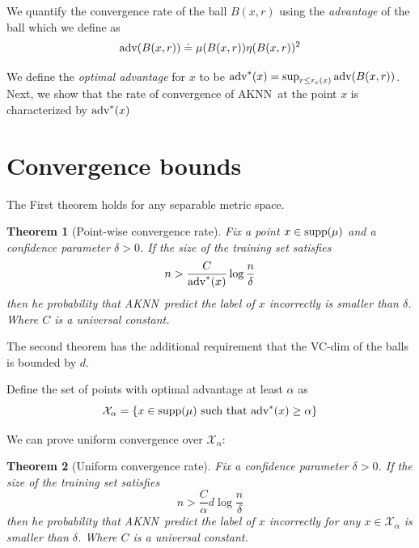 \documentclass{article}
\def\X{{\mathcal X}}
\def\supp{{\rm supp}}
\newcommand{\algname}{\textsc{AKNN}}
\newtheorem{theorem}{Theorem}
\begin{document}
We quantify the convergence rate of the ball $B(x,r)$ using the
{\em advantage} of the ball which we define as
\begin{equation}
\mbox{adv}(B(x,r)) \doteq \mu(B(x,r)) \eta(B(x,r))^2
\end{equation}

We define the {\em optimal advantage} for $x$ to be $\mbox{adv}^*(x)= \sup_{r \leq r_c(x)} \mbox{adv}(B(x,r))$.
Next, we show that the rate of convergence of \algname\ at the point $x$ is characterized by $\mbox{adv}^*(x)$

\section{Convergence bounds}

The First theorem holds for any separable metric space.
\begin{theorem} [Point-wise convergence rate]
Fix a point $x \in \supp(\mu)$ and a confidence parameter $\delta>0$. If the size of the training set satisfies   
$$ n > \frac{C}{\mbox{adv}^*(x)} \log \frac{n}{\delta}$$
then he probability that \algname\ predict the label of $x$ incorrectly is smaller than $\delta$. Where $C$ is a universal constant.
\end{theorem}


The second theorem has the additional requirement that the VC-dim of the balls is bounded by $d$.

Define the set of points with optimal advantage at least $\alpha$ as
$$ \X_\alpha = \left\{ x \in \supp(\mu) \mbox{ such that } \opt(x) \geq \alpha \right\} $$

We can prove uniform convergence over $\X_\alpha$:

\begin{theorem} [Uniform convergence rate]
Fix a confidence parameter $\delta>0$. If the size of the training set satisfies
$$ n > \frac{C}{\alpha} d \log \frac{n}{\delta}$$
then he probability that \algname\ predict the label of $x$ incorrectly for {\em any} $x \in \X_\alpha$ is smaller than $\delta$. Where $C$ is a universal constant.
\end{theorem}
\end{document}
